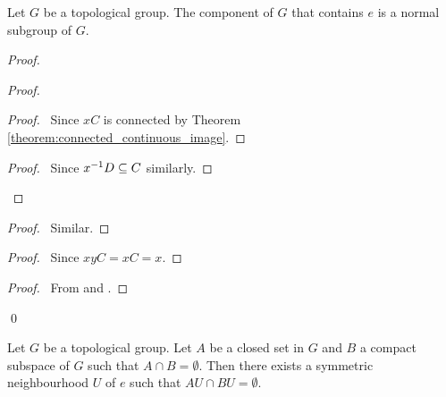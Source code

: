 \begin{proposition}
    Let $G$ be a topological group. The component of $G$ that contains $e$ is
    a normal subgroup of $G$.
\end{proposition}

\begin{proof}
    \pf
    \begin{proof}
        \begin{proof}
            \pf\ Since $xC$ is connected by Theorem \ref{theorem:connected_continuous_image}.
        \end{proof}
        \begin{proof}
            \pf\ Since ${x}^{-1}D \subseteq C$ similarly.
        \end{proof}
    \end{proof}
    \begin{proof}
        \pf\ Similar.
    \end{proof}
    \begin{proof}
        \pf\ Since $xyC = xC = x$.
    \end{proof}
    \begin{proof}
        \pf\ From  and .
    \end{proof}
    \qed
\end{proof}

\begin{lemma}
    Let $G$ be a topological group. Let $A$ be a closed set in $G$ and $B$ a compact subspace of $G$
    such that $A \cap B = \emptyset$. Then there exists a symmetric neighbourhood $U$ of $e$
    such that $AU \cap BU = \emptyset$.
\end{lemma}

